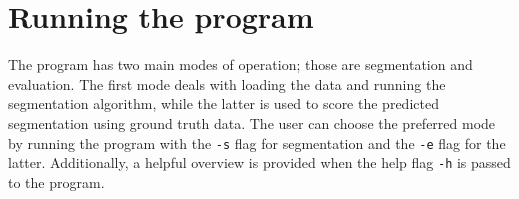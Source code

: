 \documentclass[
  digital,     %
  oneside,     %
  nosansbold,  %
  nocolorbold, %
  lof,         %
  lot,         %
]{fithesis4}
\begin{document}
\printbibliography[heading=bibintoc] %

\appendix %
\chapter{Running the program}
\label{app:running-the-program}
The program has two main modes of operation; those are segmentation and
evaluation. The first mode deals with loading the data and running the
segmentation algorithm, while the latter is used to score the predicted
segmentation using ground truth data. The user can choose the preferred
mode by running the program with the \texttt{-s} flag for segmentation and the
\texttt{-e} flag for the latter. Additionally, a helpful overview is
provided when the help flag \texttt{-h} is passed to the program.
\end{document}
